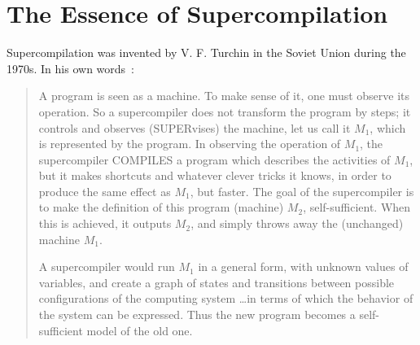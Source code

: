 \section{The Essence of Supercompilation}
\label{sec:idea}

Supercompilation was invented by V. F. Turchin in the Soviet Union during the 1970s. 
In his own words~\cite{Turchin1986Supercompiler}:
\begin{quote}
A program is seen as a machine.
To make sense of it, one must observe its operation. So a supercompiler does not transform the
program by steps; it controls and observes (SUPERvises) the machine, let us call it $M_1$, which is
represented by the program. In observing the operation of $M_1$, the supercompiler COMPILES a
program which describes the activities of $M_1$, but it makes shortcuts and whatever clever tricks
it knows, in order to produce the same effect as $M_1$, but faster. The goal of the supercompiler is
to make the definition of this program (machine) $M_2$, self-sufficient. When this is achieved, it
outputs $M_2$, and simply throws away the (unchanged) machine $M_1$.

A supercompiler would run $M_1$ in a general
form, with unknown values of variables, and create a graph of states and transitions between
possible configurations of the computing system \ldots in terms of which the behavior of the system
can be expressed. Thus the new program becomes a self-sufficient model of the old one.
\end{quote}


